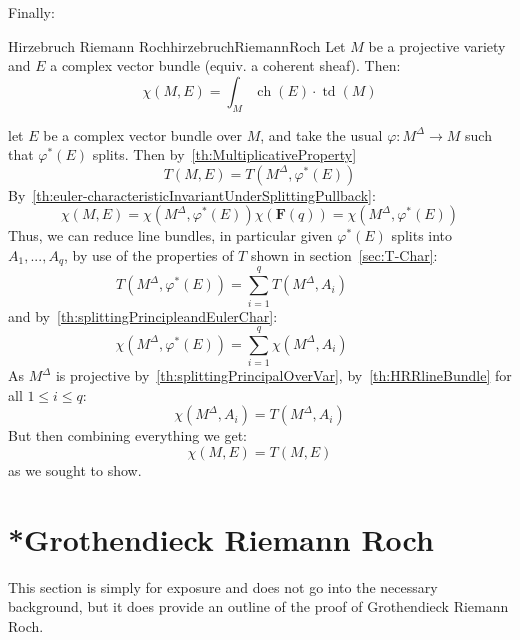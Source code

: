 \documentclass{ut-thesis}
\newenvironment{Proof}[1][]
  {\begin{ProofTcb}[#1]}
  {\end{ProofTcb}}
\renewcommand{\phi}{\varphi}
\newcommand{\ch}{{\operatorname{ch}}}
\newcommand{\td}{{\operatorname{td}}}
\renewcommand{\ch}{{\operatorname{ch}}}
\begin{document}
Finally:

\begin{thm}{Hirzebruch Riemann Roch}{hirzebruchRiemannRoch}
  Let $M$ be a projective variety and $E$ a complex vector bundle (equiv. a coherent sheaf). Then:
  \[
    \chi(M, E) = \int_M \ch(E)\cdot \td(M)
  \]
\end{thm}

\begin{Proof}
  let $E$ be a complex vector bundle over $M$, and take the usual $\phi: M^\Delta \to
  M$ such that $\phi^*(E)$ splits. Then by~\cref{th:MultiplicativeProperty}
  \[
    T(M, E) = T(M^\Delta, \phi^*(E))
  \]
  By~\cref{th:euler-characteristicInvariantUnderSplittingPullback}:
  \[
    \chi(M, E) = \chi(M^\Delta, \phi^*(E))\chi(\mathbf{F}(q)) = \chi(M^\Delta, \phi^*(E))
  \]
  Thus, we can reduce line bundles, in particular given $\phi^*(E)$ splits into $A_1, ..., A_q$, by use of the
  properties of $T$ shown in section~\ref{sec:T-Char}:
  \[
    T(M^\Delta, \phi^*(E))  = \sum_{i=1}^q T(M^\Delta, A_i) \qquad \text{} \qquad
  \]
  and by~\cref{th:splittingPrincipleandEulerChar}:
  \[
    \chi(M^\Delta, \phi^*(E))   = \sum_{i=1}^q \chi(M^\Delta, A_i) \qquad \text{} \qquad
  \]
  As $M^\Delta$ is projective by~\cref{th:splittingPrincipalOverVar}, by~\cref{th:HRRlineBundle} for all $1 \le i \le q$:
  \[
    \chi(M^\Delta, A_i) = T(M^\Delta, A_i)
  \]
  But then combining everything we get:
  \[
    \chi(M,E) = T(M, E)
  \]
  as we sought to show.
\end{Proof}


\section{*Grothendieck Riemann Roch}\label{sec:GRR}

This section is simply for exposure and does not go into the necessary background, but it does provide an
outline of the proof of Grothendieck Riemann Roch.
\end{document}
